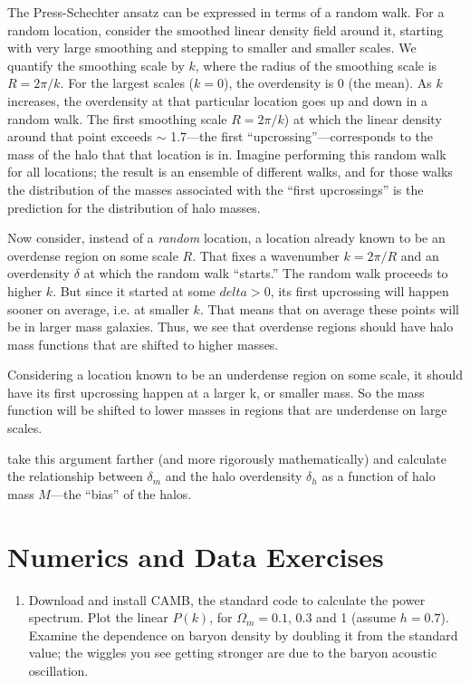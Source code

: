 \begin{enumerate}
\begin{answer}
The Press-Schechter ansatz can be expressed in terms of a random
walk. For a random location, consider the smoothed linear density
field around it, starting with very large smoothing and stepping to
smaller and smaller scales. We quantify the smoothing scale by $k$,
where the radius of the smoothing scale is $R=2\pi/k$. For the largest
scales ($k=0$), the overdensity is 0 (the mean). As $k$ increases, the
overdensity at that particular location goes up and down in a random
walk. The first smoothing scale $R=2 \pi/k$) at which the linear
density around that point exceeds $\sim$ 1.7---the first
``upcrossing''---corresponds to the mass of the halo that that
location is in. Imagine performing this random walk for all locations;
the result is an ensemble of different walks, and for those walks the
distribution of the masses associated with the ``first upcrossings''
is the prediction for the distribution of halo masses.

Now consider, instead of a {\it random} location, a location already
known to be an overdense region on some scale $R$. That fixes a
wavenumber $k= 2\pi/R$ and an overdensity $\delta$ at which the random
walk ``starts.'' The random walk proceeds to higher $k$.  But since it
started at some $delta>0$, its first upcrossing will happen sooner on
average, i.e. at smaller $k$. That means that on average these points
will be in larger mass galaxies. Thus, we see that overdense regions
should have halo mass functions that are shifted to higher masses.

Considering a location known to be an underdense region on some scale,
it should have its first upcrossing happen at a larger k, or smaller
mass. So the mass function will be shifted to lower masses in regions
that are underdense on large scales.

\citet{mo96a} take this argument farther (and more rigorously
mathematically) and calculate the relationship between $\delta_m$ and
the halo overdensity $\delta_h$ as a function of halo mass $M$---the
``bias'' of the halos.
\end{answer}

\end{enumerate}

\section{Numerics and Data Exercises}

\begin{enumerate}
\item Download and install CAMB, the standard code to calculate the
power spectrum. Plot the linear $P(k)$, for $\Omega_m= 0.1$, $0.3$ and
1 (assume $h=0.7$). Examine the dependence on baryon density by
doubling it from the standard value; the wiggles you see getting
stronger are due to the baryon acoustic oscillation.
\end{enumerate}


  
